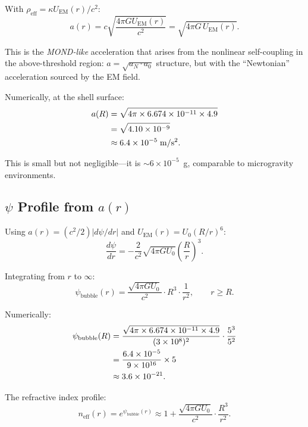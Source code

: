 \documentclass[amsmath,amssymb,aps,prd,superscriptaddress,nofootinbib]{revtex4-2}
\newcommand{\ka}{\kappa}
\begin{document}
With $\rho_\text{eff} = \ka U_\text{EM}(r)/c^2$:
\begin{equation}\label{eq:a-MOND-like}
\boxed{
a(r) = c\sqrt{\frac{4\pi G U_\text{EM}(r)}{c^2}} = \sqrt{4\pi G \, U_\text{EM}(r)}.
}
\end{equation}

This is the \emph{MOND-like} acceleration that arises from the nonlinear
self-coupling in the above-threshold region: $a = \sqrt{a_N \cdot a_0}$
structure, but with the ``Newtonian'' acceleration sourced by the EM field.

Numerically, at the shell surface:
\begin{align}
a(R) &= \sqrt{4\pi \times 6.674 \times 10^{-11} \times 4.9} \notag \\
     &= \sqrt{4.10 \times 10^{-9}} \notag \\
     &\approx 6.4 \times 10^{-5} \; \si{m/s^2}.
\end{align}

This is small but not negligible---it is $\sim 6 \times 10^{-5}$~g,
comparable to microgravity environments.

\subsection{$\psi$ Profile from $a(r)$}

Using $a(r) = (c^2/2)|d\psi/dr|$ and $U_\text{EM}(r) = U_0(R/r)^6$:
\begin{equation}
\frac{d\psi}{dr} = -\frac{2}{c^2}\sqrt{4\pi G U_0} \left(\frac{R}{r}\right)^3.
\end{equation}

Integrating from $r$ to $\infty$:
\begin{equation}\label{eq:psi-bubble-profile}
\boxed{
\psi_\text{bubble}(r) = \frac{\sqrt{4\pi G U_0}}{c^2} \cdot R^3 \cdot \frac{1}{r^2},
\qquad r \geq R.
}
\end{equation}

Numerically:
\begin{align}
\psi_\text{bubble}(R) &= \frac{\sqrt{4\pi \times 6.674 \times 10^{-11} \times 4.9}}{(3 \times 10^8)^2} \cdot \frac{5^3}{5^2} \notag \\
&= \frac{6.4 \times 10^{-5}}{9 \times 10^{16}} \times 5 \notag \\
&\approx 3.6 \times 10^{-21}.
\end{align}

The refractive index profile:
\begin{equation}
n_\text{eff}(r) = e^{\psi_\text{bubble}(r)} \approx 1 + \frac{\sqrt{4\pi G U_0}}{c^2} \cdot \frac{R^3}{r^2}.
\end{equation}
\end{document}
